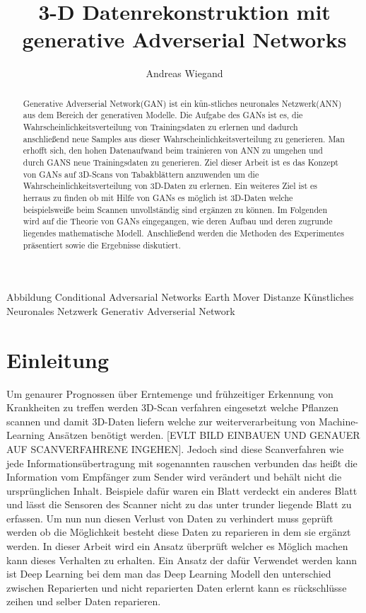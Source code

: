 \documentclass{llncs}
\begin{document}
\tableofcontents
\begin{acronym}[Bash]
	 Abbildung
	Conditional Adversarial Networks
	 Earth Mover Distanze
	 Künstliches Neuronales Netzwerk
	 Generativ Adverserial Network
\end{acronym}
\title{3-D Datenrekonstruktion mit generative Adverserial Networks}
\author{Andreas Wiegand}
\maketitle								%
%
\begin{abstract}		
Generative Adverserial Network(GAN) ist ein kün-stliches neuronales Netzwerk(ANN) aus dem Bereich der generativen Modelle. Die Aufgabe des GANs ist es, die Wahrscheinlichkeitsverteilung von Trainingsdaten zu erlernen und dadurch anschließend neue Samples aus dieser Wahrscheinlichkeitsverteilung zu generieren. Man erhofft sich, den hohen Datenaufwand beim trainieren von ANN zu umgehen und durch GANS neue Trainingsdaten zu generieren. Ziel dieser Arbeit ist es das Konzept von GANs auf 3D-Scans von Tabakblättern anzuwenden um die Wahrscheinlichkeitsverteilung von 3D-Daten zu erlernen. Ein weiteres Ziel ist es herraus zu finden ob mit Hilfe von GANs es möglich ist 3D-Daten welche beispielsweiße beim Scannen unvollständig sind ergänzen zu können. Im Folgenden wird auf die Theorie von GANs eingegangen, wie deren Aufbau und deren zugrunde liegendes mathematische Modell. Anschließend werden die Methoden des Experimentes präsentiert sowie die Ergebnisse diskutiert.  
\end{abstract}
%
\section{Einleitung}%

Um genaurer Prognossen über Erntemenge und frühzeitiger Erkennung von Krankheiten zu treffen werden 3D-Scan verfahren eingesetzt welche Pflanzen scannen und damit 3D-Daten liefern welche zur weiterverarbeitung von Machine-Learning Ansätzen benötigt werden. [EVLT BILD EINBAUEN UND GENAUER AUF SCANVERFAHRENE INGEHEN]. Jedoch sind diese Scanverfahren wie jede Informationsübertragung mit sogenannten rauschen verbunden das heißt die Information vom Empfänger zum Sender wird verändert und behält nicht die ursprünglichen Inhalt. Beispiele dafür waren ein Blatt verdeckt ein anderes Blatt und lässt die Sensoren des Scanner nicht zu das unter trunder liegende Blatt zu erfassen. Um nun nun diesen Verlust von Daten zu verhindert muss geprüft werden ob die Möglichkeit besteht diese Daten zu reparieren in dem sie ergänzt werden. In dieser Arbeit wird ein Ansatz überprüft welcher es Möglich machen kann dieses Verhalten zu erhalten.  Ein Ansatz der dafür Verwendet werden kann ist Deep Learning bei dem man das Deep Learning Modell den unterschied zwischen Reparierten und nicht reparierten Daten erlernt kann es rückschlüsse zeihen und selber Daten reparieren.
\\
\end{document}
